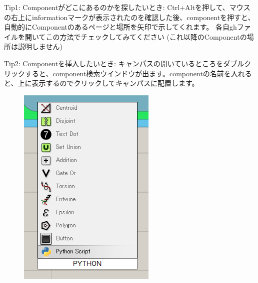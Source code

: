 \documentclass[11pt]{jarticle}
\begin{document}
\begin{itembox}[l]{Tip1: Componentがどこにあるのかを探したいとき:}
  Ctrl+Altを押して、マウスの右上にinformationマークが表示されたのを確認した後、componentを押すと、自動的にComponentのあるページと場所を矢印で示してくれます。
  各自ghファイルを開いてこの方法でチェックしてみてください (これ以降のComponentの場所は説明しません)
\end{itembox}

\begin{itembox}[l]{Tip2: Componentを挿入したいとき:}
  キャンパスの開いているところをダブルクリックすると、component検索ウインドウが出ます。componentの名前を入れると、上に表示するのでクリックしてキャンパスに配置します。\\
\begin{figure}[H]
\begin{minipage}{0.5\hsize}
\centering
\includegraphics[width=\linewidth]{fig/python.png}

\end{minipage}
\end{figure}
\end{itembox}
\end{document}

